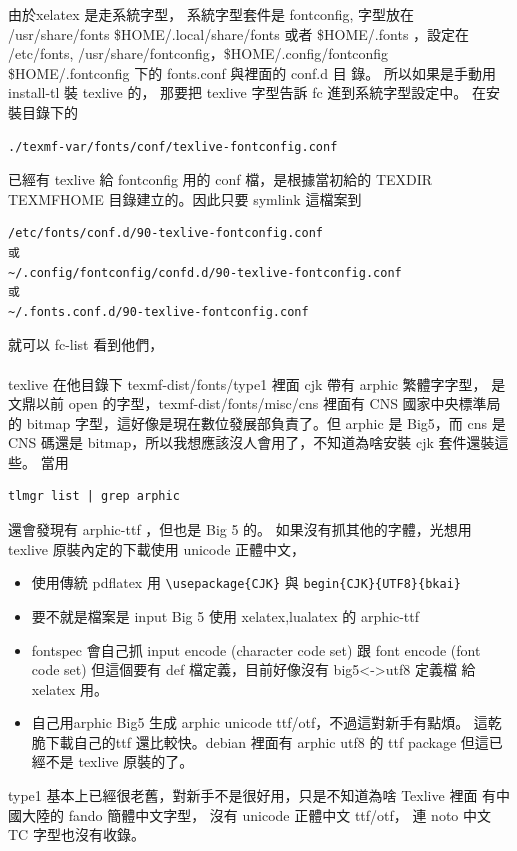 由於xelatex 是走系統字型， 系統字型套件是 fontconfig, 字型放在 /usr/share/fonts
\$HOME/.local/share/fonts 或者 \$HOME/.fonts ，設定在 /etc/fonts,
/usr/share/fontconfig，\$HOME/.config/fontconfig \$HOME/.fontconfig 下的
fonts.conf 與裡面的 conf.d 目 錄。 所以如果是手動用 install-tl 裝 texlive 的，
那要把 texlive 字型告訴 fc 進到系統字型設定中。 在安裝目錄下的
\begin{verbatim}
./texmf-var/fonts/conf/texlive-fontconfig.conf
\end{verbatim}
已經有 texlive 給 fontconfig 用的 conf 檔，是根據當初給的 TEXDIR TEXMFHOME
目錄建立的。因此只要 symlink 這檔案到
\begin{verbatim}
/etc/fonts/conf.d/90-texlive-fontconfig.conf
或
~/.config/fontconfig/confd.d/90-texlive-fontconfig.conf
或
~/.fonts.conf.d/90-texlive-fontconfig.conf
\end{verbatim}
就可以 fc-list 看到他們，
\\\\
texlive 在他目錄下 texmf-dist/fonts/type1 裡面 cjk 帶有 arphic 繁體字字型，
是文鼎以前 open 的字型，texmf-dist/fonts/misc/cns 裡面有 CNS 國家中央標準局
的 bitmap 字型，這好像是現在數位發展部負責了。但 arphic 是 Big5，而 cns 是
CNS 碼還是 bitmap，所以我想應該沒人會用了，不知道為啥安裝 cjk 套件還裝這些。
當用
\begin{verbatim}
tlmgr list | grep arphic
\end{verbatim}
還會發現有 arphic-ttf ，但也是 Big 5 的。 如果沒有抓其他的字體，光想用
texlive 原裝內定的下載使用 unicode 正體中文，
\begin{itemize}
  \item 使用傳統 pdflatex 用 \verb=\usepackage{CJK}= 與
    \verb=begin{CJK}{UTF8}{bkai}=
  \item 要不就是檔案是 input Big 5 使用 xelatex,lualatex 的 arphic-ttf
  \item fontspec 會自己抓 input encode (character code set) 跟 font encode 
    (font code set) 但這個要有 def 檔定義，目前好像沒有 big5<->utf8 定義檔
    給 xelatex 用。
  \item 自己用arphic Big5 生成 arphic unicode ttf/otf，不過這對新手有點煩。
    這乾脆下載自己的ttf 還比較快。debian 裡面有 arphic utf8 的 ttf package
    但這已經不是 texlive 原裝的了。
\end{itemize}
type1 基本上已經很老舊，對新手不是很好用，只是不知道為啥 Texlive 裡面
有中國大陸的 fando 簡體中文字型， 沒有 unicode 正體中文 ttf/otf，
連 noto 中文 TC 字型也沒有收錄。
